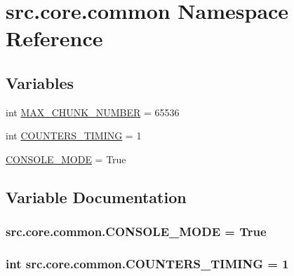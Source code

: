 \hypertarget{namespacesrc_1_1core_1_1common}{}\section{src.\+core.\+common Namespace Reference}
\label{namespacesrc_1_1core_1_1common}
\subsection*{Variables}
\begin{DoxyCompactItemize}
\item 
int \hyperlink{namespacesrc_1_1core_1_1common_a805531af2f86fc6e673a4bdc2f3d0837}{M\+A\+X\+\_\+\+C\+H\+U\+N\+K\+\_\+\+N\+U\+M\+B\+E\+R} = 65536
\item 
int \hyperlink{namespacesrc_1_1core_1_1common_adc302cadec42557679043c5353587cdd}{C\+O\+U\+N\+T\+E\+R\+S\+\_\+\+T\+I\+M\+I\+N\+G} = 1
\item 
\hyperlink{namespacesrc_1_1core_1_1common_aaa9fb3b1d3694f422c4955c69af24918}{C\+O\+N\+S\+O\+L\+E\+\_\+\+M\+O\+D\+E} = True
\end{DoxyCompactItemize}


\subsection{Variable Documentation}
\hypertarget{namespacesrc_1_1core_1_1common_aaa9fb3b1d3694f422c4955c69af24918}{}
\subsubsection[{C\+O\+N\+S\+O\+L\+E\+\_\+\+M\+O\+D\+E}]{\setlength{\rightskip}{0pt plus 5cm}src.\+core.\+common.\+C\+O\+N\+S\+O\+L\+E\+\_\+\+M\+O\+D\+E = True}\label{namespacesrc_1_1core_1_1common_aaa9fb3b1d3694f422c4955c69af24918}
\hypertarget{namespacesrc_1_1core_1_1common_adc302cadec42557679043c5353587cdd}{}
\subsubsection[{C\+O\+U\+N\+T\+E\+R\+S\+\_\+\+T\+I\+M\+I\+N\+G}]{\setlength{\rightskip}{0pt plus 5cm}int src.\+core.\+common.\+C\+O\+U\+N\+T\+E\+R\+S\+\_\+\+T\+I\+M\+I\+N\+G = 1}\label{namespacesrc_1_1core_1_1common_adc302cadec42557679043c5353587cdd}
\hypertarget{namespacesrc_1_1core_1_1common_a805531af2f86fc6e673a4bdc2f3d0837}{}
